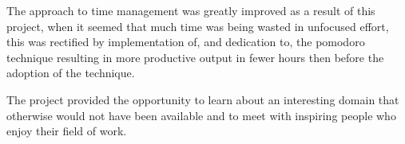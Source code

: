 The approach to time management was greatly improved as a result of this project, when it seemed that much time was being wasted in unfocused effort, this was rectified by implementation of, and dedication to, the pomodoro technique resulting in more productive output in fewer hours then before the adoption of the technique.

The project provided the opportunity to learn about an interesting domain that otherwise would not have been available and to meet with inspiring people who enjoy their field of work.
